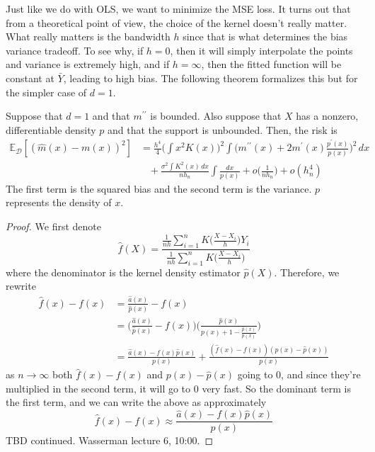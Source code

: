   Just like we do with OLS, we want to minimize the MSE loss. It turns out that from a theoretical point of view, the choice of the kernel doesn't really matter. What really matters is the bandwidth $h$ since that is what determines the bias variance tradeoff. To see why, if $h = 0$, then it will simply interpolate the points and variance is extremely high, and if $h = \infty$, then the fitted function will be constant at $\bar{Y}$, leading to high bias. The following theorem formalizes this but for the simpler case of $d = 1$. 

  \begin{theorem}
    Suppose that $d = 1$ and that $m^{\prime\prime}$ is bounded. Also suppose that $X$ has a nonzero, differentiable density $p$ and that the support is unbounded. Then, the risk is 
    \begin{align}
      \mathbb{E}_{\mathcal{D}} \left[ (\hat{m}(x) - m(x))^2 \right] & = \frac{h^4}{4} \bigg( \int x^2 K(x) \bigg)^2 \int \bigg( m^{\prime\prime} (x) + 2m^\prime (x) \frac{p^\prime (x)}{p(x)} \bigg)^2 \,dx \\
          & \;\;\; + \frac{\sigma^2 \int K^2(x)\,dx} {n h_n} \int \frac{dx}{p(x)} + o \bigg( \frac{1}{n h_n} \bigg) + o(h_n^4) 
    \end{align}
    The first term is the squared bias and the second term is the variance. $p$ represents the density of $x$. 
  \end{theorem}
  \begin{proof}
    We first denote 
    \begin{equation}
      \hat{f}(X) = \frac{\frac{1}{nh} \sum_{i=1}^n K \bigg( \frac{X - X_i}{h} \bigg) Y_i}{\frac{1}{nh} \sum_{i=1}^n K \bigg( \frac{X - X_i}{h} \bigg)} 
    \end{equation}
    where the denominator is the kernel density estimator $\hat{p}(X)$. Therefore, we rewrite
    \begin{align}
      \hat{f} (x) - f(x) & = \frac{\hat{a}(x)}{\hat{p}(x)} - f(x) \\
                         & = \bigg( \frac{\hat{a}(x)}{\hat{p}(x)} - f(x) \bigg) \bigg( \frac{\hat{p}(x)}{p(x) + 1 - \frac{\hat{p}(x)}{p(x)}} \bigg) \\
                         & = \frac{\hat{a}(x) - f(x) \hat{p}(x)}{p(x)} + \frac{(\hat{f}(x) - f(x)) (p(x) - \hat{p}(x))}{p(x)}
    \end{align}
    as $n \rightarrow \infty$ both $\hat{f}(x) - f(x)$ and $p(x) - \hat{p}(x)$ going to $0$, and since they're multiplied in the second term, it will go to $0$ very fast. So the dominant term is the first term, and we can write the above as approximately 
    \begin{equation}
      \hat{f}(x) - f(x) \approx  \frac{\hat{a}(x) - f(x) \hat{p}(x)}{p(x)}
    \end{equation}
    TBD continued. Wasserman lecture 6, 10:00. 
  \end{proof}

